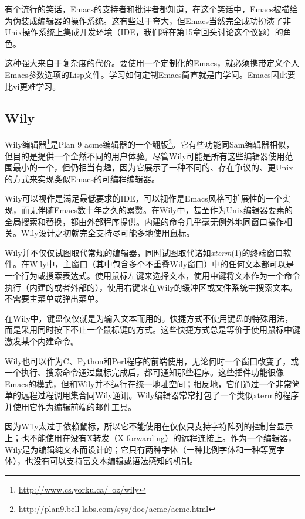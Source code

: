 \documentclass[12pt,oneside]{book}
\begin{document}
有个流行的笑话，Emacs的支持者和批评者都知道，在这个笑话中，Emacs被描绘为伪装成编辑器的操作系统。这有些过于夸大，但Emacs当然完全成功扮演了非Unix操作系统上集成开发环境（IDE，我们将在第15章回头讨论这个议题）的角色。

这种强大来自于复杂度的代价。要使用一个定制化的Emacs，就必须携带定义个人Emacs参数选项的Lisp文件。学习如何定制Emacs简直就是门学问。Emacs因此要比vi更难学习。

\subsection{Wily}
Wily编辑器\footnote{\href{http://www.cs.yorku.ca/~oz/wily}{http://www.cs.yorku.ca/~oz/wily}}是Plan 9 acme编辑器的一个翻版\footnote{\href{http://plan9.bell-labs.com/sys/doc/acme/acme.html}{http://plan9.bell-labs.com/sys/doc/acme/acme.html}}。它有些功能同Sam编辑器相似，但目的是提供一个全然不同的用户体验。尽管Wily可能是所有这些编辑器使用范围最小的一个，但仍相当有趣，因为它展示了一种不同的、存在争议的、更Unix的方式来实现类似Emacs的可编程编辑器。

Wily可以视作是满足最低要求的IDE，可以视作是Emacs风格可扩展性的一个实现，而无伴随Emacs数十年之久的累赘。在Wily中，甚至作为Unix编辑器要素的全局搜索和替换，都由外部程序提供。内建的命令几乎毫无例外地同窗口操作相关。Wily设计之初就完全支持尽可能多地使用鼠标。

Wily并不仅仅试图取代常规的编辑器，同时试图取代诸如\textit{xterm}(1)的终端窗口软件。在Wily中，主窗口（其中包含多个不重叠Wily窗口）中的任何文本都可以是一个行为或搜索表达式。使用鼠标左键来选择文本，使用中键将文本作为一个命令执行（内建的或者外部的），使用右键来在Wily的缓冲区或文件系统中搜索文本。不需要主菜单或弹出菜单。

在Wily中，键盘仅仅就是为输入文本而用的。快捷方式不使用键盘的特殊用法，而是采用同时按下不止一个鼠标键的方式。这些快捷方式总是等价于使用鼠标中键激发某个内建命令。

Wily也可以作为C、Python和Perl程序的前端使用，无论何时一个窗口改变了，或一个执行、搜索命令通过鼠标完成后，都可通知那些程序。这些插件功能很像Emacs的模式，但和Wily并不运行在统一地址空间；相反地，它们通过一个非常简单的远程过程调用集合同Wily通讯。Wily编辑器常常打包了一个类似xterm的程序并使用它作为编辑前端的邮件工具。

因为Wily太过于依赖鼠标，所以它不能使用在仅仅只支持字符阵列的控制台显示上；也不能使用在没有X转发（X forwarding）的远程连接上。作为一个编辑器，Wily是为编辑纯文本而设计的；它只有两种字体（一种比例字体和一种等宽字体），也没有可以支持富文本编辑或语法感知的机制。
\end{document}
